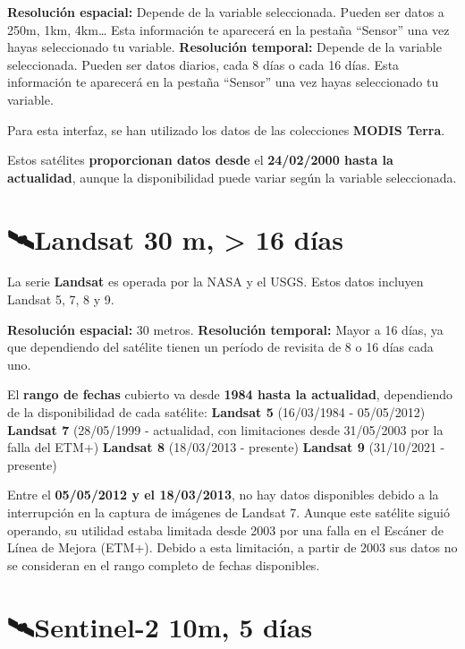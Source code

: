 \documentclass[
]{book}
\begin{document}
\textbf{Resolución espacial:} Depende de la variable seleccionada. Pueden ser datos a 250m, 1km, 4km\ldots{} Esta información te aparecerá en la pestaña ``Sensor'' una vez hayas seleccionado tu variable.
\textbf{Resolución temporal:} Depende de la variable seleccionada. Pueden ser datos diarios, cada 8 días o cada 16 días. Esta información te aparecerá en la pestaña ``Sensor'' una vez hayas seleccionado tu variable.

Para esta interfaz, se han utilizado los datos de las colecciones \textbf{MODIS Terra}.

Estos satélites \textbf{proporcionan datos desde} el \textbf{24/02/2000 hasta la actualidad}, aunque la disponibilidad puede variar según la variable seleccionada.

\section{\texorpdfstring{\textbf{🛰️Landsat 30 m, \textgreater{} 16 días}}{🛰️Landsat 30 m, \textgreater{} 16 días}}\label{landsat-30-m-16-duxedas}

La serie \textbf{Landsat} es operada por la NASA y el USGS. Estos datos incluyen Landsat 5, 7, 8 y 9.

\textbf{Resolución espacial:} 30 metros.
\textbf{Resolución temporal:} Mayor a 16 días, ya que dependiendo del satélite tienen un período de revisita de 8 o 16 días cada uno.

El \textbf{rango de fechas} cubierto va desde \textbf{1984 hasta la actualidad}, dependiendo de la disponibilidad de cada satélite:
\textbf{Landsat 5} (16/03/1984 - 05/05/2012)
\textbf{Landsat 7} (28/05/1999 - actualidad, con limitaciones desde 31/05/2003 por la falla del ETM+)
\textbf{Landsat 8} (18/03/2013 - presente)
\textbf{Landsat 9} (31/10/2021 - presente)

Entre el \textbf{05/05/2012 y el 18/03/2013}, no hay datos disponibles debido a la interrupción en la captura de imágenes de Landsat 7. Aunque este satélite siguió operando, su utilidad estaba limitada desde 2003 por una falla en el Escáner de Línea de Mejora (ETM+). Debido a esta limitación, a partir de 2003 sus datos no se consideran en el rango completo de fechas disponibles.

\section{\texorpdfstring{\textbf{🛰️Sentinel-2 10m, 5 días}}{🛰️Sentinel-2 10m, 5 días}}\label{sentinel-2-10m-5-duxedas}
\end{document}
